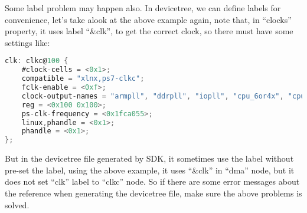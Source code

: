 Some label problem may happen also. In devicetree, we can define labels for convenience, let's take alook at the above example again, note that, in ``clocks'' property, it uses label ``\&clk'', to get the correct clock, so there must have some settings like:

{\renewcommand\baselinestretch{0.8}\selectfont
\begin{lstlisting}[frame=single,language=C]
clk: clkc@100 {
	#clock-cells = <0x1>;
	compatible = "xlnx,ps7-clkc";
	fclk-enable = <0xf>;
	clock-output-names = "armpll", "ddrpll", "iopll", "cpu_6or4x", "cpu_3or2x", "cpu_2x", "cpu_1x", "ddr2x", "ddr3x", "dci", "lqspi", "smc", "pcap", "gem0", "gem1", "fclk0", "fclk1", "fclk2", "fclk3", "can0", "can1", "sdio0", "sdio1", "uart0", "uart1", "spi0", "spi1", "dma", "usb0_aper", "usb1_aper", "gem0_aper", "gem1_aper", "sdio0_aper", "sdio1_aper", "spi0_aper", "spi1_aper", "can0_aper", "can1_aper", "i2c0_aper", "i2c1_aper", "uart0_aper", "uart1_aper", "gpio_aper", "lqspi_aper", "smc_aper", "swdt", "dbg_trc", "dbg_apb";
	reg = <0x100 0x100>;
	ps-clk-frequency = <0x1fca055>;
	linux,phandle = <0x1>;
	phandle = <0x1>;
};
\end{lstlisting}
\par}

But in the devicetree file generated by SDK, it sometimes use the label without pre-set the label, using the above example, it uses ``\&clk'' in ``dma'' node, but it does not set ``clk'' label to ``clkc'' node. So if there are some error messages about the reference when generating the devicetree file, make sure the above problems is solved.




